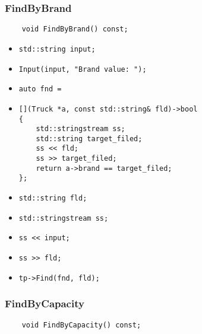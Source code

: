 \subsubsection*{FindByBrand}

\begin{lstlisting}
    void FindByBrand() const;
\end{lstlisting}

\begin{itemize}
	\item \verb|std::string input;|
    \item \verb|Input(input, "Brand value: ");|
    \item \verb|auto fnd =|
    \item \verb|[](Truck *a, const std::string& fld)->bool|\\
    \verb|{|\\
    \verb|    std::stringstream ss;|\\
    \verb|    std::string target_filed;|\\
    \verb|    ss << fld;|\\
    \verb|    ss >> target_filed;|\\
    \verb|    return a->brand == target_filed;|\\
    \verb|};|
    \item \verb|std::string fld;|
    \item \verb|std::stringstream ss;|
    \item \verb|ss << input;|
    \item \verb|ss >> fld;|
    \item \verb|tp->Find(fnd, fld);|
\end{itemize}



\subsubsection*{FindByCapacity}

\begin{lstlisting}
    void FindByCapacity() const;
\end{lstlisting}

